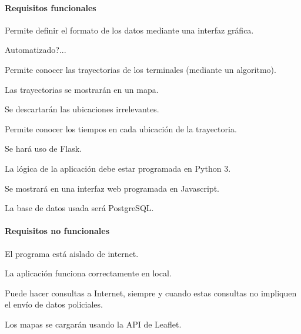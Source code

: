 \paragraph{Requisitos funcionales}

\begin{functional}
        \item Permite definir el formato de los datos mediante una interfaz gráfica.
        \begin{functional}
                \item Automatizado?...\cite{leaflet}
        \end{functional}
    
        \item Permite  conocer las trayectorias de los terminales (mediante un algoritmo).
        \begin{functional}
        	\item Las trayectorias se mostrarán en un mapa.
        	\item Se descartarán las ubicaciones irrelevantes.
        \end{functional}
    	\item Permite conocer los tiempos en cada ubicación de la trayectoria.
        

		\item Se hará uso de Flask.
		\begin{functional}
			\item La lógica de la aplicación debe estar programada en Python 3.
			\item Se mostrará en una interfaz web programada en Javascript.
		\end{functional}

		\item La base de datos usada será PostgreSQL.        
\end{functional}

\paragraph{Requisitos no funcionales}

\begin{nonfunctional}
        \item El programa está aislado de internet.
        \begin{nonfunctional}
                \item La aplicación funciona correctamente en local.
                \item Puede hacer consultas a Internet, siempre y cuando estas consultas no impliquen el envío de datos policiales.
        \end{nonfunctional}
    

        \item Los mapas se cargarán usando la API de Leaflet.
\end{nonfunctional}
